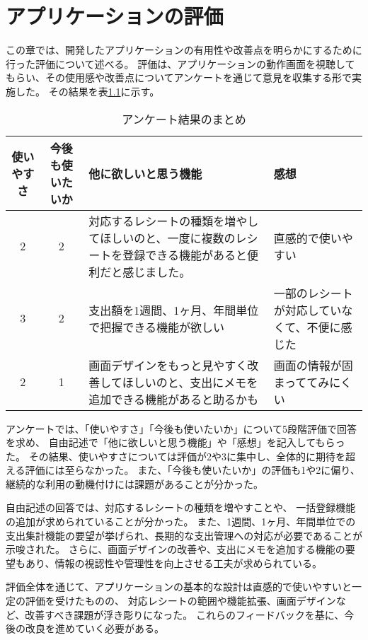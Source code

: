 \documentclass[main]{subfiles}
\begin{document}
\chapter{アプリケーションの評価}
\label{cha:evalidation}

この章では、開発したアプリケーションの有用性や改善点を明らかにするために行った評価について述べる。
評価は、アプリケーションの動作画面を視聴してもらい、その使用感や改善点についてアンケートを通じて意見を収集する形で実施した。
その結果を表\ref{tab:survey_results}に示す。

\begin{table}[tb]
    \caption{アンケート結果のまとめ}
    \label{tab:survey_results}
    \centering
    \begin{tabular}{|c|c|p{5cm}|p{5cm}|}
        \hline
        {使いやすさ} & {今後も使いたいか} & {他に欲しいと思う機能} & {感想} \\
                \hline
                2 & 2 & 対応するレシートの種類を増やしてほしいのと、一度に複数のレシートを登録できる機能があると便利だと感じました。 & 直感的で使いやすい \\
                \hline
                3 & 2 & 支出額を1週間、1ヶ月、年間単位で把握できる機能が欲しい & 一部のレシートが対応していなくて、不便に感じた \\
                \hline
                2 & 1 & 画面デザインをもっと見やすく改善してほしいのと、支出にメモを追加できる機能があると助るかも &画面の情報が固まっててみにくい\\
                \hline
        \end{tabular}
    \end{table}        

アンケートでは、「使いやすさ」「今後も使いたいか」について5段階評価で回答を求め、
自由記述で「他に欲しいと思う機能」や「感想」を記入してもらった。
その結果、使いやすさについては評価が2や3に集中し、全体的に期待を超える評価には至らなかった。
また、「今後も使いたいか」の評価も1や2に偏り、継続的な利用の動機付けには課題があることが分かった。

自由記述の回答では、対応するレシートの種類を増やすことや、
一括登録機能の追加が求められていることが分かった。
また、1週間、1ヶ月、年間単位での支出集計機能の要望が挙げられ、長期的な支出管理への対応が必要であることが示唆された。
さらに、画面デザインの改善や、支出にメモを追加する機能の要望もあり、情報の視認性や管理性を向上させる工夫が求められている。

評価全体を通じて、アプリケーションの基本的な設計は直感的で使いやすいと一定の評価を受けたものの、
対応レシートの範囲や機能拡張、画面デザインなど、改善すべき課題が浮き彫りになった。
これらのフィードバックを基に、今後の改良を進めていく必要がある。
\end{document}
